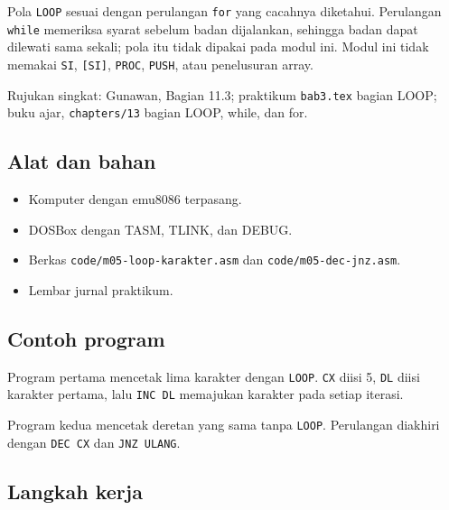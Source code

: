 Pola \texttt{LOOP} sesuai dengan perulangan \texttt{for} yang
cacahnya diketahui. Perulangan \texttt{while} memeriksa syarat
sebelum badan dijalankan, sehingga badan dapat dilewati sama sekali;
pola itu tidak dipakai pada modul ini. Modul ini tidak memakai
\texttt{SI}, \texttt{[SI]}, \texttt{PROC}, \texttt{PUSH}, atau
penelusuran array.

\begin{rujukan}
Rujukan singkat: Gunawan, Bagian 11.3; praktikum \texttt{bab3.tex}
bagian LOOP; buku ajar, \texttt{chapters/13} bagian LOOP, while, dan
for.
\end{rujukan}

\subsection{Alat dan bahan}

\begin{itemize}
    \item Komputer dengan emu8086 terpasang.
    \item DOSBox dengan TASM, TLINK, dan DEBUG.
    \item Berkas \texttt{code/m05-loop-karakter.asm} dan
          \texttt{code/m05-dec-jnz.asm}.
    \item Lembar jurnal praktikum.
\end{itemize}

\subsection{Contoh program}

Program pertama mencetak lima karakter dengan \texttt{LOOP}.
\texttt{CX} diisi 5, \texttt{DL} diisi karakter pertama, lalu
\texttt{INC DL} memajukan karakter pada setiap iterasi.



Program kedua mencetak deretan yang sama tanpa \texttt{LOOP}.
Perulangan diakhiri dengan \texttt{DEC CX} dan \texttt{JNZ ULANG}.



\subsection{Langkah kerja}

